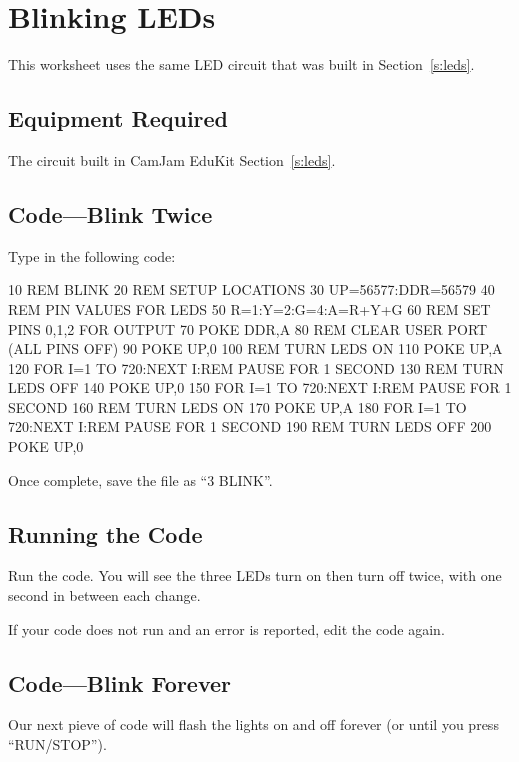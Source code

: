 \section{Blinking LEDs}


This worksheet uses the same LED circuit that was built in Section~\ref{s:leds}.

\subsection*{Equipment Required}

The circuit built in CamJam EduKit Section~\ref{s:leds}.

\subsection*{Code---Blink Twice}

Type in the following code:
\begin{basic}
10 REM BLINK
20 REM SETUP LOCATIONS
30 UP=56577:DDR=56579
40 REM PIN VALUES FOR LEDS
50 R=1:Y=2:G=4:A=R+Y+G
60 REM SET PINS 0,1,2 FOR OUTPUT
70 POKE DDR,A
80 REM CLEAR USER PORT (ALL PINS OFF)
90 POKE UP,0
100 REM TURN LEDS ON
110 POKE UP,A
120 FOR I=1 TO 720:NEXT I:REM PAUSE FOR 1 SECOND
130 REM TURN LEDS OFF
140 POKE UP,0
150 FOR I=1 TO 720:NEXT I:REM PAUSE FOR 1 SECOND
160 REM TURN LEDS ON
170 POKE UP,A
180 FOR I=1 TO 720:NEXT I:REM PAUSE FOR 1 SECOND
190 REM TURN LEDS OFF
200 POKE UP,0
\end{basic}

Once complete, save the file as ``3 BLINK''.

\subsection*{Running the Code}

Run the code.  You will see the three LEDs turn on then turn off twice, with one second in between each change.

If your code does not run and an error is reported, edit the code again.

\subsection*{Code---Blink Forever}

Our next pieve of code will flash the lights on and off forever (or until you press ``RUN/STOP'').

